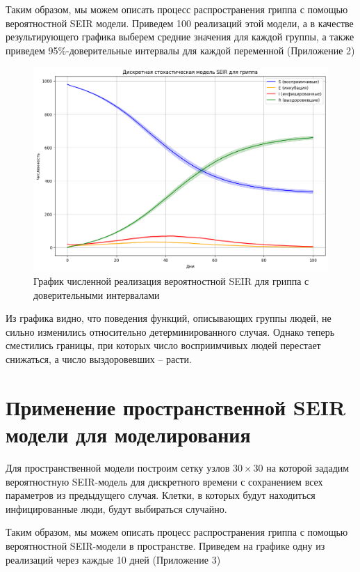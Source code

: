 \documentclass[a4paper, 14pt]{extreport}
\numberwithin{equation}{section}
\begin{document}
	Таким образом, мы можем описать процесс распространения гриппа с помощью вероятностной SEIR модели. Приведем 100 реализаций этой модели, а в качестве результирующего графика выберем средние значения для каждой группы, а также приведем 95\%-доверительные интервалы для каждой переменной (Приложение 2)
	
	\begin{figure}[h]
		\centering
		\includegraphics[scale=0.5]{images/graph02}
		\caption{График численной реализация вероятностной SEIR для гриппа с доверительными интервалами}
		\label{fig:graph02}
	\end{figure}
	
	Из графика видно, что поведения функций, описывающих группы людей, не сильно изменились относительно детерминированного случая. Однако теперь сместились границы, при которых число восприимчивых людей перестает снижаться, а число выздоровевших -- расти. 
	
	\section{Применение пространственной SEIR модели для моделирования}
	Для пространственной модели построим сетку узлов $30 \times 30$ на которой зададим вероятностную SEIR-модель для дискретного времени с сохранением всех параметров из предыдущего случая. Клетки, в которых будут находиться инфицированные люди, будут выбираться случайно.
	
	Таким образом, мы можем описать процесс распространения гриппа с помощью вероятностной SEIR-модели в пространстве. Приведем на графике одну из реализаций через каждые 10 дней (Приложение 3)
	
\end{document}
